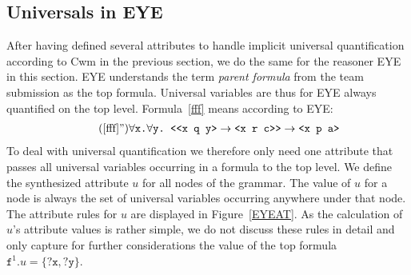 \subsection{Universals in EYE}
After having defined several attributes to handle implicit universal quantification according to Cwm in the previous section, 
we do the same for the reasoner
EYE in this section. EYE understands the term \emph{parent formula} from the \wwwc team submission 
as the top formula.
Universal variables are thus for EYE always quantified on the top level. Formula~\ref{fff} means according to EYE:
\begin{multline}\tag{\ref{fff}''}\label{fff'}
  \forall \texttt{x.}\forall\texttt{y.}
 \texttt{ <{}<x q y>}\rightarrow\texttt{<x r c>{}>}\rightarrow\texttt{<x p a>}
\end{multline}
To deal with universal quantification we therefore only need one attribute that passes all universal variables occurring in a formula to the top level.
We define the synthesized attribute $u$ for all nodes of the grammar. %
The value of $u$ for a node is always the set of universal variables occurring anywhere under that node. %
The attribute rules for $u$ are displayed in Figure~\ref{EYEAT}. As the calculation of $u$'s attribute values is rather simple, 
we do not discuss these rules in detail and only capture for further considerations the value of the top formula  $\texttt{f}^1.u=\{\texttt{?x}, \texttt{?y}\}$.
